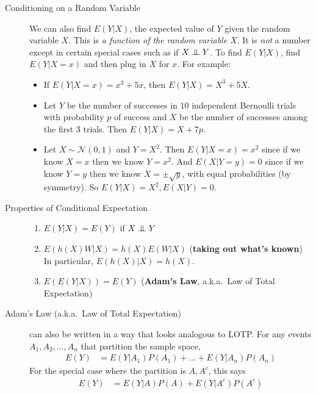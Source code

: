 \documentclass[6pt, landscape]{article}
\renewcommand{\N}{\mathcal{N}}
\newcommand\independent{\protect\mathpalette{\protect\independenT}{\perp}}
\def\independenT#1#2{\mathrel{\setbox0\hbox{$#1#2$}%
    \copy0\kern-\wd0\mkern4mu\box0}}
\begin{document}
\begin{multicols}{3}
        \begin{description}
                \item[Conditioning on a Random Variable]  We can also find $E(Y|X)$, the expected value of $Y$ given the random variable $X$. This is \emph{a function of the random variable $X$}. It is \emph{not} a number except in certain special cases such as if $X \independent Y$. To find $E(Y|X)$, find $E(Y|X = x)$ and then plug in $X$ for $x$. For example:
                      \begin{itemize}
                              \item If $E(Y|X=x) = x^3+5x$, then $E(Y|X) = X^3 + 5X$.
                              \item Let $Y$ be the number of successes in $10$ independent Bernoulli trials with probability $p$ of success and $X$ be the number of successes among the first $3$ trials. Then $E(Y|X)=X+7p$.
                              \item Let $X \sim \N(0,1)$ and $Y=X^2$. Then $E(Y|X=x) = x^2$ since if we know $X=x$ then we know $Y=x^2$. And $E(X|Y=y) = 0$ since if we know $Y=y$ then we know $X = \pm \sqrt{y}$, with equal probabilities (by symmetry). So $E(Y|X)=X^2, E(X|Y)=0$.
                      \end{itemize}

                \item[Properties of Conditional Expectation] \quad
                      \begin{enumerate}
                              \item $E(Y|X) = E(Y)$ if $X \independent Y$
                              \item $E(h(X)W|X) = h(X)E(W|X)$ (\textbf{taking out what's known}) \\
                                    In particular, $E(h(X)|X) = h(X)$.
                              \item $E(E(Y|X)) = E(Y)$ (\textbf{Adam's Law}, a.k.a.~Law of Total Expectation)
                      \end{enumerate}

                \item[Adam's Law (a.k.a.~Law of Total Expectation)]  can also be written in a way that looks analogous to LOTP. For any events $A_1, A_2, \dots, A_n$ that partition the sample space,
                      \begin{align*}
                              E(Y) & = E(Y|A_1)P(A_1) + \dots + E(Y|A_n)P(A_n)
                      \end{align*}
                      For the special case where the partition is $A, A^c$, this says
                      \begin{align*}
                              E(Y) & = E(Y|A)P(A) + E(Y|A^c)P(A^c)
                      \end{align*}


\end{description}
\end{multicols}
\end{document}
